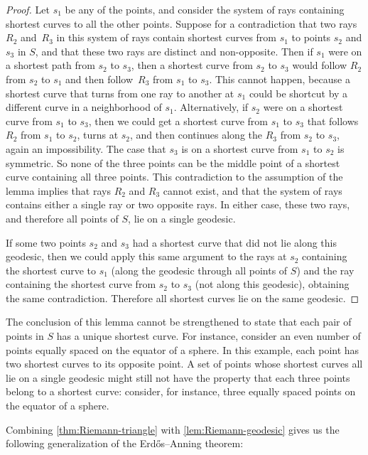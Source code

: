 \documentclass[11pt]{article}
\theoremstyle{definition}
\begin{document}
\begin{proof}
Let $s_1$ be any of the points, and consider the system of rays containing shortest curves to all the other points. Suppose for a contradiction that two rays $R_2$ and~$R_3$ in this system of rays contain shortest curves from $s_1$ to points $s_2$ and $s_3$ in $S$,
and that these two rays are distinct and non-opposite. Then if $s_1$ were on a shortest path from $s_2$ to $s_3$, then a shortest curve from $s_2$ to $s_3$ would follow $R_2$ from $s_2$ to $s_1$ and then follow~$R_3$ from $s_1$ to $s_3$. This cannot happen, because a shortest curve that turns from one ray to another at $s_1$ could be shortcut by a different curve in a neighborhood of $s_1$. Alternatively, if $s_2$ were on a shortest curve from $s_1$ to $s_3$, then we could get a shortest curve from $s_1$ to $s_3$ that follows $R_2$ from $s_1$ to $s_2$, turns at $s_2$, and then continues along the $R_3$ from $s_2$ to $s_3$, again an impossibility. The case that $s_3$ is on a shortest curve from $s_1$ to $s_2$ is symmetric. So none of the three points can be the middle point of a shortest curve containing all three points. This contradiction to the assumption of the lemma implies that rays $R_2$ and $R_3$ cannot exist, and that the system of rays contains either a single ray or two opposite rays. In either case, these two rays, and therefore all points of $S$, lie on a single geodesic.

If some two points $s_2$ and $s_3$ had a shortest curve that did not lie along this geodesic, then we could apply this same argument to the rays at $s_2$ containing the shortest curve to $s_1$ (along the geodesic through all points of $S$) and the ray containing the shortest curve from $s_2$ to $s_3$ (not along this geodesic), obtaining the same contradiction. Therefore all shortest curves lie on the same geodesic.
\end{proof}

The conclusion of this lemma cannot be strengthened to state that each pair of points in $S$ has a unique shortest curve. For instance, consider an even number of points equally spaced on the equator of a sphere. In this example, each point has two shortest curves to its opposite point. A set of points whose shortest curves all lie on a single geodesic might still not have the property that each three points belong to a shortest curve: consider, for instance, three equally spaced points on the equator of a sphere.

Combining \cref{thm:Riemann-triangle} with \cref{lem:Riemann-geodesic} gives us the following generalization of the Erd\H{o}s--Anning theorem:
\end{document}
